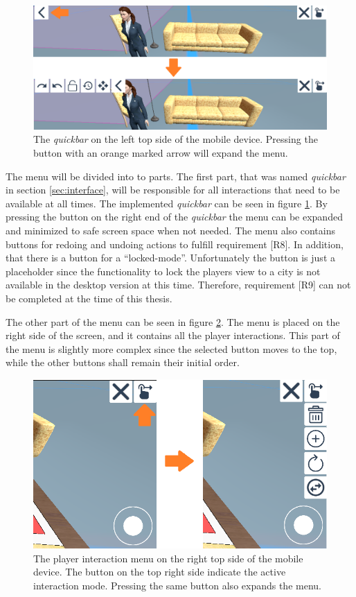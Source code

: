 \begin{figure}[htb]
    \centering
    \includegraphics[width=1\textwidth]{Implementation/img/quickmenu.png}
    \caption{The \textit{quickbar} on the left top side of the mobile device. Pressing the button with an orange marked arrow will expand the menu.}\label{fig:quickmenu}
\end{figure}

The menu will be divided into to parts.
The first part, that was named \textit{quickbar} in section \ref{sec:interface}, will be responsible for all interactions that need to be available at all times.
The implemented \textit{quickbar} can be seen in figure \ref{fig:quickmenu}.
By pressing the button on the right end of the \textit{quickbar} the menu can be expanded and minimized to safe screen space when not needed.
The menu also contains buttons for redoing and undoing actions to fulfill requirement [R8].
In addition, that there is a button for a \enquote{locked-mode}.
Unfortunately the button is just a placeholder since the functionality to lock the players view to a city is not available in the desktop version at this time.
Therefore, requirement [R9] can not be completed at the time of this thesis. 

The other part of the menu can be seen in figure \ref{fig:interaction_menu}.
The menu is placed on the right side of the screen, and it contains all the player interactions.
This part of the menu is slightly more complex since the selected button moves to the top, while the other buttons shall remain their initial order.

\begin{figure}[htb]
    \centering
    \includegraphics[width=1\textwidth]{Implementation/img/menu.png}
    \caption{The player interaction menu on the right top side of the mobile device. The button on the top right side indicate the active interaction mode. Pressing the same button also expands the menu.}\label{fig:interaction_menu}
\end{figure}


